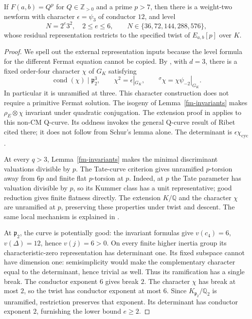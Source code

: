 \begin{theorem}\label{fm-five-levels}
If $F(a,b)=Q^p$ for $Q\in\mathbb Z_{>0}$ and a prime $p>7$, then
there is a weight-two newform
with character $\epsilon=\psi_3$ of conductor $12$, and level
\begin{equation}\label{fm-five-level-list}
 N=2^e3^2,\quad2\le e\le6,
 \qquad N\in\{36,72,144,288,576\},
\end{equation}
whose residual representation restricts to the specified twist of
$E_{a,b}[p]$ over $K$.
\end{theorem}
\begin{proof}
We spell out the external representation inputs because the level formula
for the different Fermat equation cannot be copied.
By \cite[Theorem~3.2 and Table~3.3]{PacettiVillagra2022QCurves}, with
$d=3$, there is a fixed order-four character $\chi$ of $G_K$ satisfying
\[
 \operatorname{cond}(\chi)\mid\mathfrak p_2^3,\qquad
 \chi^2=\epsilon|_{G_K},\qquad
 {}^\sigma\chi=\chi\psi_{-2}|_{G_K}.
\]
In particular it is unramified at three. This character construction
does not require a primitive Fermat solution. The isogeny of
Lemma~\ref{fm-invariants} makes $\rho_E\otimes\chi$ invariant under
quadratic conjugation. The extension proof in
\cite[Theorem~4.2]{PacettiVillagra2022QCurves} applies to this non-CM
Q-curve. Its oddness invokes the general Q-curve result of Ribet cited
there; it does not follow from Schur's lemma alone. The determinant is
$\epsilon\chi_{\mathrm{cyc}}$.

At every $q>3$, Lemma~\ref{fm-invariants} makes the minimal discriminant
valuations divisible by $p$. The Tate-curve criterion gives unramified
$p$-torsion away from $6p$ and finite flat $p$-torsion at $p$.
Indeed, at $p$ the Tate parameter has valuation divisible by $p$, so
its Kummer class has a unit representative; good reduction gives finite
flatness directly. The extension $K/\mathbb Q$ and the character $\chi$
are unramified at $p$, preserving these properties under twist and descent.
The same local mechanism is explained in
\cite[Propositions~3.6--3.9]{Koutsianas2020GeneralizedFermat}.

At $\mathfrak p_2$, the curve is potentially good: the invariant formulas
give $v(c_4)=6$, $v(\Delta)=12$, hence $v(j)=6>0$.
On every finite higher inertia group its characteristic-zero
representation has determinant one. Its fixed subspace cannot have
dimension one: semisimplicity would make the complementary character
equal to the determinant, hence trivial as well. Thus its ramification
has a single break. The conductor exponent $6$ gives break $2$.
The character $\chi$ has break at most $2$, so the twist has conductor
exponent at most $6$. Since $K_{\mathfrak p_2}/\mathbb Q_2$ is unramified,
restriction preserves that exponent. Its determinant has conductor
exponent $2$, furnishing the lower bound $e\ge2$.


\end{proof}
